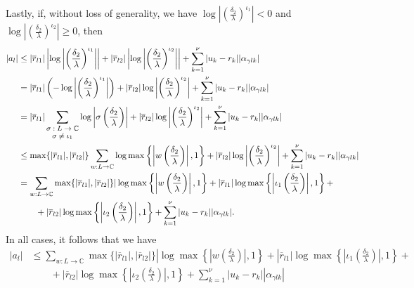 Lastly, if, without loss of generality, we have $\log\left|\left(\frac{\delta_2}{\lambda}\right)^{\iota_1}\right| < 0$ and $\log\left|\left(\frac{\delta_2}{\lambda}\right)^{\iota_2}\right| \geq 0$, then
\begin{align*}
|a_l| 	& \leq |\overline{r}_{l1}|\left|\log\left|\left(\frac{\delta_2}{\lambda}\right)^{\iota_1}\right|\right| + |\overline{r}_{l2}|\left|\log\left|\left(\frac{\delta_2}{\lambda}\right)^{\iota_2}\right|\right| + \sum_{k=1}^{\nu}|u_k-r_k||\alpha_{\gamma l k}|\\
	& = |\overline{r}_{l1}|\left(-\log\left|\left(\frac{\delta_2}{\lambda}\right)^{\iota_1}\right|\right) + |\overline{r}_{l2}|\log\left|\left(\frac{\delta_2}{\lambda}\right)^{\iota_2}\right| + \sum_{k=1}^{\nu}|u_k-r_k||\alpha_{\gamma l k}|\\
	& = |\overline{r}_{l1}|\sum_{\shortstack{\footnotesize $\sigma: L \to \mathbb{C} $\\ \footnotesize $ \sigma \neq \iota_1$}} \log\left|\sigma \left(\frac{\delta_2}{\lambda}\right)\right|+ |\overline{r}_{l2}|\log\left|\left(\frac{\delta_2}{\lambda}\right)^{\iota_2}\right| + \sum_{k=1}^{\nu}|u_k-r_k||\alpha_{\gamma l k}|\\
	& \leq \max\{|\overline{r}_{l1}|, |\overline{r}_{l2}|\}\sum_{w: L \to \mathbb{C}} \log \max \left\{\left|w\left(\frac{\delta_2}{\lambda}\right)\right|, 1\right\} +  |\overline{r}_{l2}|\log\left|\left(\frac{\delta_2}{\lambda}\right)^{\iota_2}\right| +\sum_{k=1}^{\nu}|u_k-r_k||\alpha_{\gamma l k}|\\
	& = \sum_{w: L \to \mathbb{C}}\max\{|\overline{r}_{l1}|, |\overline{r}_{l2}|\}|\log\max\left\{\left|w\left(\frac{\delta_2}{\lambda}\right)\right|,1\right\} + |\overline{r}_{l1}|\log\max\left\{\left|\iota_1\left(\frac{\delta_2}{\lambda}\right)\right|,1\right\}+ \\
	&\quad\quad + |\overline{r}_{l2}|\log\max\left\{\left|\iota_2\left(\frac{\delta_2}{\lambda}\right)\right|,1\right\}+ \sum_{k=1}^{\nu}|u_k-r_k||\alpha_{\gamma l k}|.
\end{align*}
In all cases, it follows that we have 
\begin{align*}
|a_l|	& \leq \sum_{w: L \to \mathbb{C}}\max\{|\overline{r}_{l1}|, |\overline{r}_{l2}|\}|\log\max\left\{\left|w\left(\frac{\delta_2}{\lambda}\right)\right|,1\right\} + |\overline{r}_{l1}|\log\max\left\{\left|\iota_1\left(\frac{\delta_2}{\lambda}\right)\right|,1\right\} + \\
	&\quad\quad + |\overline{r}_{l2}|\log\max\left\{\left|\iota_2\left(\frac{\delta_2}{\lambda}\right)\right|,1\right\}+ \sum_{k=1}^{\nu}|u_k-r_k||\alpha_{\gamma l k}|
\end{align*}
